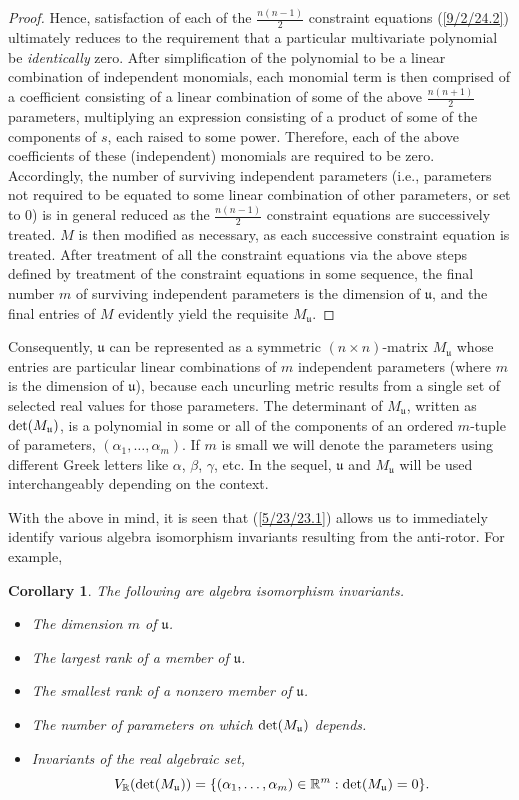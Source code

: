 \documentclass{amsart}
\newtheorem{corollary}[theorem]{Corollary}
\theoremstyle{definition}
\numberwithin{theorem}{section}
\numberwithin{equation}{section}
\begin{document}
\begin{proof}
Hence, satisfaction of each of the $\frac{n(n-1)}{2}$ constraint equations (\ref{9/2/24.2}) ultimately reduces to the requirement that a particular multivariate polynomial be {\it identically} zero.  After simplification of the polynomial to be a linear combination of independent monomials, each monomial term is then comprised of a coefficient consisting of a linear combination of some of the above $\frac{n(n+1)}{2}$ parameters, multiplying an expression consisting of a product of some of the components of $s$, each raised to some power.  Therefore, each of the above coefficients of these (independent) monomials are required to be zero.  Accordingly, the number of surviving independent parameters (i.e., parameters not required to be equated to some linear combination of other parameters, or set to 0) is in general reduced as the $\frac{n(n-1)}{2}$ constraint equations are successively treated.  $M$ is then modified as necessary, as each successive constraint equation is treated.  After treatment of all the constraint equations via the above steps defined by treatment of the constraint equations in some sequence, the final number $m$ of surviving independent parameters is the dimension of $\mathfrak{u}$, and the final entries of $M$ evidently yield the requisite $M_\mathfrak{u}$.
\end{proof}


Consequently, $\mathfrak{u}$ can be represented as a symmetric $(n\times n)$-matrix $M_{\mathfrak{u}}$ whose entries are particular linear combinations of $m$ independent parameters (where $m$ is the dimension of $\mathfrak{u}$), because each uncurling metric results from a single set of selected real values for those parameters.  The determinant of $M_{\mathfrak{u}}$, written as ${\rm det}(M_{\mathfrak{u}})$, is a polynomial in some or all of the components of an ordered $m$-tuple of parameters, $(\alpha_1,\dots,\alpha_m)$.  If $m$ is small  we will denote the parameters using different Greek letters like $\alpha$, $\beta $, $\gamma$, etc. In the sequel, $\mathfrak{u}$ and $M_{\mathfrak{u}}$ will be used interchangeably depending on the context.


   With the above in mind, it is seen that (\ref{5/23/23.1}) allows us to immediately identify various algebra isomorphism invariants resulting from the anti-rotor. For example,
            
  \begin{corollary}\label{8/18/23.2} The following are algebra isomorphism invariants. \begin{itemize} \item The dimension $m$ of $\mathfrak{u}$.   \item The largest rank  of a member of $\mathfrak{u}$.  \item The smallest rank of a nonzero member of $\mathfrak{u}$. \item The number of parameters on which ${\rm det}(M_{\mathfrak{u}})$ depends. \item Invariants of the real algebraic set, \[V_\mathbb{R}({\rm det}(M_{\mathfrak{u}})) = \{(\alpha_1,\dots,\alpha_m)\in\mathbb{R}^m: {\rm det}(M_{\mathfrak{u}}) = 0 \}.\] \end{itemize} \end{corollary}
   
\end{document}
